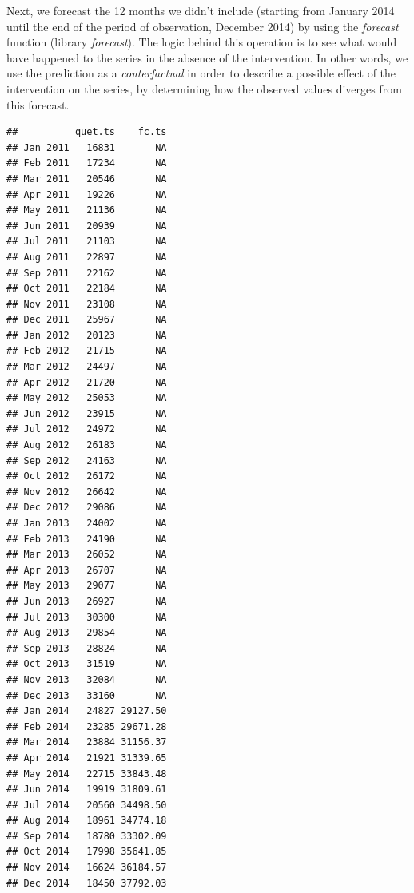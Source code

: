 \documentclass[
]{article}
\newenvironment{Shaded}{\begin{snugshade}}{\end{snugshade}}
\newcommand{\CommentTok}[1]{\textcolor[rgb]{0.56,0.35,0.01}{\textit{#1}}}
\newcommand{\DataTypeTok}[1]{\textcolor[rgb]{0.13,0.29,0.53}{#1}}
\newcommand{\DecValTok}[1]{\textcolor[rgb]{0.00,0.00,0.81}{#1}}
\newcommand{\FloatTok}[1]{\textcolor[rgb]{0.00,0.00,0.81}{#1}}
\newcommand{\KeywordTok}[1]{\textcolor[rgb]{0.13,0.29,0.53}{\textbf{#1}}}
\newcommand{\NormalTok}[1]{#1}
\newcommand{\OperatorTok}[1]{\textcolor[rgb]{0.81,0.36,0.00}{\textbf{#1}}}
\newcommand{\StringTok}[1]{\textcolor[rgb]{0.31,0.60,0.02}{#1}}
\begin{document}
Next, we forecast the 12 months we didn't include (starting from January 2014 until the end of the period of observation, December 2014) by using the \emph{forecast} function (library \emph{forecast}). The logic behind this operation is to see what would have happened to the series in the absence of the intervention. In other words, we use the prediction as a \emph{couterfactual} in order to describe a possible effect of the intervention on the series, by determining how the observed values diverges from this forecast.

\begin{Shaded}
\end{Shaded}

\begin{verbatim}
##          quet.ts    fc.ts
## Jan 2011   16831       NA
## Feb 2011   17234       NA
## Mar 2011   20546       NA
## Apr 2011   19226       NA
## May 2011   21136       NA
## Jun 2011   20939       NA
## Jul 2011   21103       NA
## Aug 2011   22897       NA
## Sep 2011   22162       NA
## Oct 2011   22184       NA
## Nov 2011   23108       NA
## Dec 2011   25967       NA
## Jan 2012   20123       NA
## Feb 2012   21715       NA
## Mar 2012   24497       NA
## Apr 2012   21720       NA
## May 2012   25053       NA
## Jun 2012   23915       NA
## Jul 2012   24972       NA
## Aug 2012   26183       NA
## Sep 2012   24163       NA
## Oct 2012   26172       NA
## Nov 2012   26642       NA
## Dec 2012   29086       NA
## Jan 2013   24002       NA
## Feb 2013   24190       NA
## Mar 2013   26052       NA
## Apr 2013   26707       NA
## May 2013   29077       NA
## Jun 2013   26927       NA
## Jul 2013   30300       NA
## Aug 2013   29854       NA
## Sep 2013   28824       NA
## Oct 2013   31519       NA
## Nov 2013   32084       NA
## Dec 2013   33160       NA
## Jan 2014   24827 29127.50
## Feb 2014   23285 29671.28
## Mar 2014   23884 31156.37
## Apr 2014   21921 31339.65
## May 2014   22715 33843.48
## Jun 2014   19919 31809.61
## Jul 2014   20560 34498.50
## Aug 2014   18961 34774.18
## Sep 2014   18780 33302.09
## Oct 2014   17998 35641.85
## Nov 2014   16624 36184.57
## Dec 2014   18450 37792.03
\end{verbatim}
\end{document}
